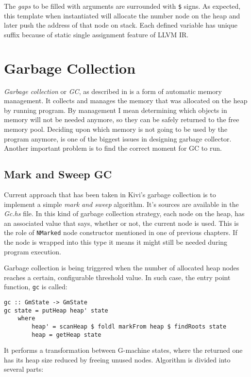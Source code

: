 \documentclass[12pt,a4paper]{report}
\begin{document}
The \textit{gaps} to be filled with arguments are surrounded with \texttt{\$}
signs. As expected, this template when instantiated will allocate the number
node on the heap and later push the address of that node on stack. Each defined
variable has unique suffix because of static single assignment feature of LLVM
IR.


\section{Garbage Collection}
\label{sec:garbage_collection}
\textit{Garbage collection} or \textit{GC}, as described in
\cite{wiki:garbage_collection} is a form of automatic memory management. It
collects and manages the memory that was allocated on the heap by running
program. By management I mean determining which objects in memory will not be
needed anymore, so they can be safely returned to the free memory pool.
Deciding upon which memory is not going to be used by the program anymore, is
one of the biggest issues in designing garbage collector. Another important
problem is to find the correct moment for GC to run.

\subsection{Mark and Sweep GC}
Current approach that has been taken in Kivi's garbage collection is to
implement a simple \textit{mark and sweep} algorithm. It's sources are
available in the \textit{Gc.hs} file. In this kind of garbage collection
strategy, each node on the heap, has an associated value that says, whether or
not, the current node is used. This is the role of \texttt{NMarked} node
constructor mentioned in one of previous chapters. If the node is wrapped into
this type it means it might still be needed during program execution.

Garbage collection is being triggered when the number of allocated heap nodes
reaches a certain, configurable threshold value. In such case, the entry point
function, \texttt{gc} is called:

\hspace*{-1.5in}
\begin{lstlisting}[style=haskell]
gc :: GmState -> GmState
gc state = putHeap heap' state
    where
        heap' = scanHeap $ foldl markFrom heap $ findRoots state
        heap = getHeap state
\end{lstlisting}

It performs a transformation between G-machine states, where the returned one
has its heap size reduced by freeing unused nodes. Algorithm is divided into
several parts:
\end{document}
